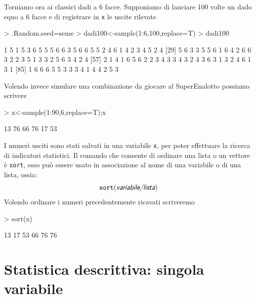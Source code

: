 \documentclass[onecolumn,12pt]{book}
\newcommand{\varia}[1]{\textsl{\textsf{#1}}}
\begin{document}
Torniamo ora ai classici dadi a 6 facce.
Supponiamo di lanciare 100 volte un dado equo a 6 facce e di registrare in \texttt{x}
le uscite rilevate
\begin{Schunk}
\begin{Sinput}
> .Random.seed=seme
> dadi100<-sample(1:6,100,replace=T)
> dadi100
\end{Sinput}
\begin{Soutput}
  [1] 1 5 1 5 3 6 5 5 5 6 6 3 5 6 6 5 5 2 4 6 1 4 2 3 4 5 2 4
 [29] 5 6 3 3 5 5 6 1 6 4 2 6 6 3 2 2 3 5 1 3 3 2 5 6 3 4 2 4
 [57] 2 1 4 1 6 5 6 2 2 3 4 3 3 4 3 2 4 3 6 3 1 3 2 4 6 1 3 1
 [85] 1 6 6 6 5 5 3 3 3 4 1 4 4 2 5 3
\end{Soutput}
\end{Schunk}
Volendo invece simulare una combinazione da giocare al SuperEnalotto possiamo scrivere
\begin{Schunk}
\begin{Sinput}
> x<-sample(1:90,6,replace=T);x
\end{Sinput}
\begin{Soutput}
[1] 13 76 66 76 17 53
\end{Soutput}
\end{Schunk}
 I numeri usciti sono stati salvati  in una variabile \texttt{x}, per poter effettuare la ricerca di indicatori statistici.
Il comando che consente di ordinare una lista o un vettore \`e \texttt{sort}, esso pu\`o essere usato in associazione al nome di una variabile o di una lista, ossia:
\begin{equation}\texttt{sort}(\varia{variabile/lista})\end{equation}
Volendo ordinare i numeri precedentemente ricavati scriveremo
\begin{Schunk}
\begin{Sinput}
> sort(x)
\end{Sinput}
\begin{Soutput}
[1] 13 17 53 66 76 76
\end{Soutput}
\end{Schunk}



\section{Statistica descrittiva: singola variabile}
\end{document}

